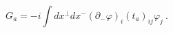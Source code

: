 \begin{equation}
G_a = -i\int dx^\perp dx^- (\partial_- \varphi)_i
(t_a)_{ij}\varphi_j \ .
\end{equation}

